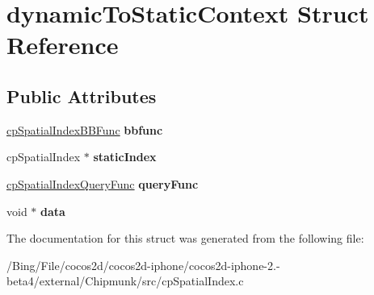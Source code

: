 \hypertarget{structdynamic_to_static_context}{\section{dynamic\-To\-Static\-Context Struct Reference}
\label{structdynamic_to_static_context}
}
\subsection*{Public Attributes}
\begin{DoxyCompactItemize}
\item 
\hypertarget{structdynamic_to_static_context_ae427e68858adca9f57c17b473660778e}{\hyperlink{group__cp_spatial_index_gafbecd34bd436d4a56200b7a542d94fc1}{cp\-Spatial\-Index\-B\-B\-Func} {\bfseries bbfunc}}\label{structdynamic_to_static_context_ae427e68858adca9f57c17b473660778e}

\item 
\hypertarget{structdynamic_to_static_context_a58bc48eced74b86e30478977a3352df7}{cp\-Spatial\-Index $\ast$ {\bfseries static\-Index}}\label{structdynamic_to_static_context_a58bc48eced74b86e30478977a3352df7}

\item 
\hypertarget{structdynamic_to_static_context_a03091eec026e20e583aed7fa1afc9071}{\hyperlink{group__cp_spatial_index_ga4885d6b7a5f9f613a19a25e1c7ec5073}{cp\-Spatial\-Index\-Query\-Func} {\bfseries query\-Func}}\label{structdynamic_to_static_context_a03091eec026e20e583aed7fa1afc9071}

\item 
\hypertarget{structdynamic_to_static_context_a7071dde72219343f209ad26dee4b1454}{void $\ast$ {\bfseries data}}\label{structdynamic_to_static_context_a7071dde72219343f209ad26dee4b1454}

\end{DoxyCompactItemize}


The documentation for this struct was generated from the following file\-:\begin{DoxyCompactItemize}
\item 
/\-Bing/\-File/cocos2d/cocos2d-\/iphone/cocos2d-\/iphone-\/2.-\/beta4/external/\-Chipmunk/src/cp\-Spatial\-Index.\-c\end{DoxyCompactItemize}
